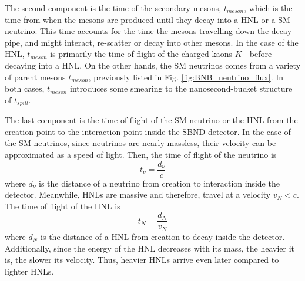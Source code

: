The second component is the time of the secondary mesons, $t_{meson}$, which is the time from when the mesons are produced until they decay into a HNL or a SM neutrino.
This time accounts for the time the mesons travelling down the decay pipe, and might interact, re-scatter or decay into other mesons.
In the case of the HNL, $t_{meson}$ is primarily the time of flight of the charged kaons $K^+$ before decaying into a HNL.
On the other hands, the SM neutrinos comes from a variety of parent mesons $t_{meson}$, previously listed in Fig. \ref{fig:BNB_neutrino_flux}.
In both cases, $t_{meson}$ introduces some smearing to the nanosecond-bucket structure of $t_{spill}$.

The last component is the time of flight of the SM neutrino or the HNL from the creation point to the interaction point inside the SBND detector.
In the case of the SM neutrinos, since neutrinos are nearly massless, their velocity can be approximated as a speed of light. 
Then, the time of flight of the neutrino is  
\begin{equation}
	t_{\nu} = \frac{d_{\nu}}{c}
\end{equation}
where $d_{\nu}$ is the distance of a neutrino from creation to interaction inside the detector.
Meanwhile, HNLs are massive and therefore, travel at a velocity $v_N < c$.
The time of flight of the HNL is
\begin{equation}
	t_{N} = \frac{d_{N}}{v_N}
\end{equation}
where $d_N$ is the distance of a HNL from creation to decay inside the detector.
Additionally, since the energy of the HNL decreases with its mass, the heavier it is, the slower its velocity.
Thus, heavier HNLs arrive even later compared to lighter HNLs.


